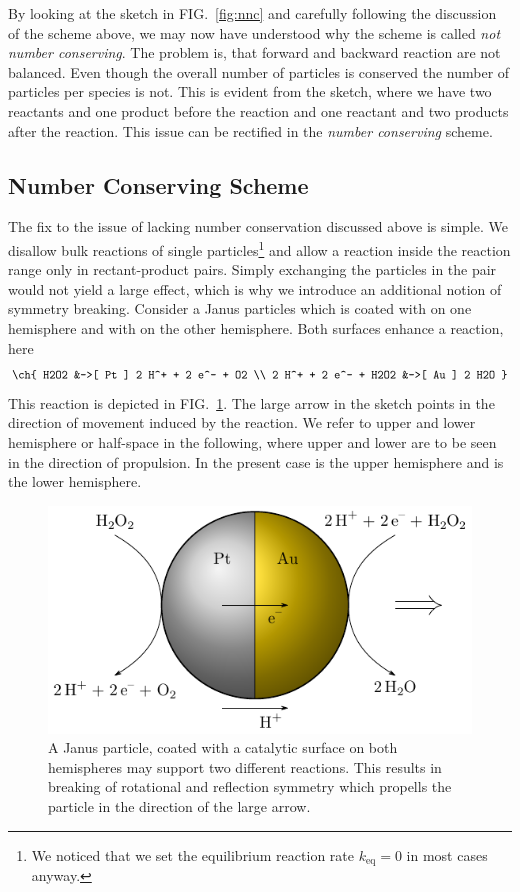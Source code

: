 \documentclass[aip,jcp,reprint,a4paper,onecolumn,nofootinbib,amsmath,amssymb]{revtex4-1}
\begin{document}
By looking at the sketch in FIG.~\ref{fig:nnc} and carefully following
the discussion of the scheme above, we may now have understood why the
scheme is called \emph{not number conserving}.  The problem is, that
forward and backward reaction are not balanced.  Even though the
overall number of particles is conserved the number of particles per
species is not.  This is evident from the sketch, where we have two
reactants and one product before the reaction and one reactant and two
products after the reaction.  This issue can be rectified in the
\emph{number conserving} scheme.

\subsection{Number Conserving Scheme}

The fix to the issue of lacking number conservation discussed above is
simple.  We disallow bulk reactions of single particles\footnote{We
  noticed that we set the equilibrium reaction rate $k_{\text{eq}} =
  0$ in most cases anyway.} and allow a reaction inside the reaction
range only in rectant-product pairs.  Simply exchanging the particles
in the pair would not yield a large effect, which is why we introduce
an additional notion of symmetry breaking.  Consider a Janus particles
which is coated with  on one hemisphere and with  on the
other hemisphere.  Both surfaces enhance a reaction,
here\cite{Gibbs_10,Wheat_10}
\begin{align}
  \label{eq:H2O2}
  \ch{
    H2O2 &->[ Pt ] 2 H^+ + 2 e^- + O2 \\
    2 H^+ + 2 e^- + H2O2 &->[ Au ] 2 H2O
  }
\end{align}
This reaction is depicted in FIG.~\ref{fig:janus}.  The large arrow in
the sketch points in the direction of movement induced by the
reaction.  We refer to upper and lower hemisphere or half-space in the
following, where upper and lower are to be seen in the direction of
propulsion.  In the present case  is the upper hemisphere and
 is the lower hemisphere.

\begin{figure}
  \centering
  \includegraphics{FIGURES/janus-particle}
  \caption{A Janus particle, coated with a catalytic surface on both
    hemispheres may support two different reactions.  This results in
    breaking of rotational and reflection symmetry which propells the
    particle in the direction of the large arrow.}
  \label{fig:janus}
\end{figure}
\end{document}
